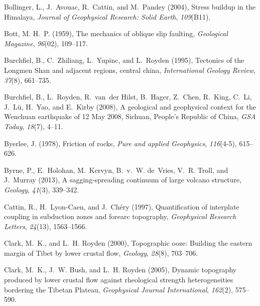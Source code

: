 \documentclass[twocolumn,jgrga]{AGUTeX}
\begin{document}
\begin{article}
{{\begin{thebibliography}{87}
Bollinger, L., J.~Avouac, R.~Cattin, and M.~Pandey (2004), Stress buildup in
  the {H}imalaya, \textit{Journal of Geophysical Research: Solid Earth},
  \textit{109}(B11).

Bott, M. H.~P. (1959), The mechanics of oblique slip faulting,
  \textit{Geological Magazine}, \textit{96}(02), 109--117.

Burchfiel, B., C.~Zhiliang, L.~Yupinc, and L.~Royden (1995), Tectonics of the
  {L}ongmen {S}han and adjacent regions, central {}china, \textit{International
  Geology Review}, \textit{37}(8), 661--735.

Burchfiel, B., L.~Royden, R.~van~der Hilst, B.~Hager, Z.~Chen, R.~King, C.~Li,
  J.~L{\"u}, H.~Yao, and E.~Kirby (2008), A geological and geophysical context
  for the {W}enchuan earthquake of 12 {M}ay 2008, {S}ichuan, {P}eople's
  {R}epublic of {C}hina, \textit{GSA Today}, \textit{18}(7), 4--11.

Byerlee, J. (1978), Friction of rocks, \textit{Pure and applied Geophysics},
  \textit{116}(4-5), 615--626.

Byrne, P., E.~Holohan, M.~Kervyn, B.~v.~W. de~Vries, V.~R. Troll, and J.~Murray
  (2013), A sagging-spreading continuum of large volcano structure,
  \textit{Geology}, \textit{41}(3), 339--342.

Cattin, R., H.~Lyon-Caen, and J.~Ch{\'e}ry (1997), Quantification of interplate
  coupling in subduction zones and forearc topography, \textit{Geophysical
  Research Letters}, \textit{24}(13), 1563--1566.

Clark, M.~K., and L.~H. Royden (2000), Topographic ooze: {B}uilding the eastern
  margin of {T}ibet by lower crustal flow, \textit{Geology}, \textit{28}(8),
  703--706.

Clark, M.~K., J.~W. Bush, and L.~H. Royden (2005), Dynamic topography produced
  by lower crustal flow against rheological strength heterogeneities bordering
  the {T}ibetan {P}lateau, \textit{Geophysical Journal International},
  \textit{162}(2), 575--590.


\end{thebibliography}}}
\end{article}
\end{document}
